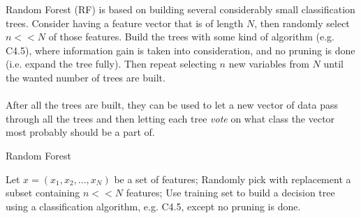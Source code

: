 Random Forest (RF) is based on building several considerably small classification trees. Consider having a feature vector that is of length $N$, then randomly select $n << N$ of those features. Build the trees with some kind of algorithm (e.g. C4.5), where information gain is taken into consideration, and no pruning is done (i.e. expand the tree fully). Then repeat selecting $n$ new variables from $N$ until the wanted number of trees are built.
\\\\
After all the trees are built, they can be used to let a new vector of data pass through all the trees and then letting each tree \emph{vote} on what class the vector most probably should be a part of.

\begin{algorithm}
\caption{Random Forest
    \label{alg:RF}}
\begin{algorithmic}
\State Let $x = (x_1,x_2,...,x_N)$ be a set of features;
	\State Randomly pick with replacement a subset containing $n << N$ features;
	\State Use training set to build a decision tree using a classification algorithm, e.g. C4.5, except no pruning is done.
\EndWhile
\end{algorithmic}
\end{algorithm}